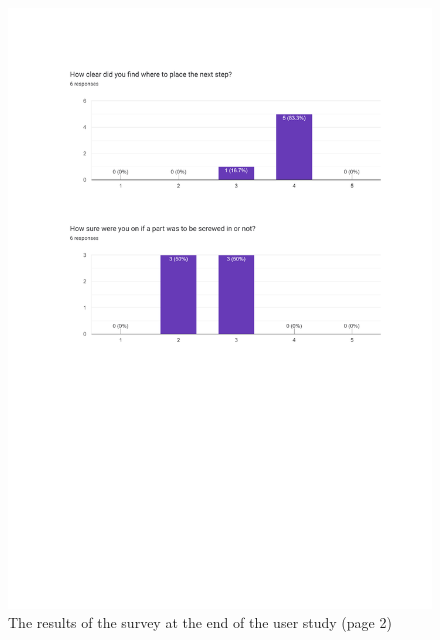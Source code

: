 \documentclass{l4proj}
\begin{document}
\begin{appendices}
\begin{figure}
    \centering
    \includegraphics[width=1\linewidth]{dissertation//images/2ndQuestionnaireResults2.pdf}
    \caption{The results of the survey at the end of the user study (page 2)}
\end{figure}


\end{appendices}
\end{document}
